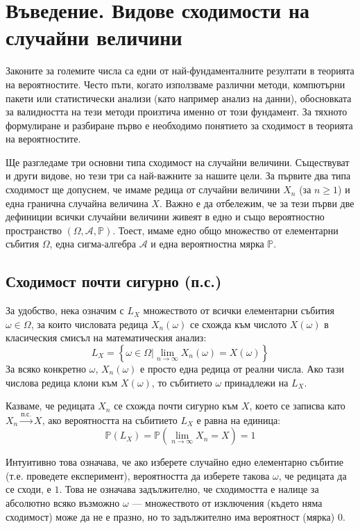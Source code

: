 \section{Въведение. Видове сходимости на случайни величини}

Законите за големите числа са едни от най-фундаменталните резултати в теорията на вероятностите. Често пъти, когато използваме различни методи, компютърни пакети или статистически анализи (като например анализ на данни), обосновката за валидността на тези методи произтича именно от този фундамент. За тяхното формулиране и разбиране първо е необходимо понятието за сходимост в теорията на вероятностите.

Ще разгледаме три основни типа сходимост на случайни величини. Съществуват и други видове, но тези три са най-важните за нашите цели. За първите два типа сходимост ще допуснем, че имаме редица от случайни величини $X_n$ (за $n \ge 1$) и една гранична случайна величина $X$. Важно е да отбележим, че за тези първи две дефиниции всички случайни величини живеят в едно и също вероятностно пространство $(\Omega, \mathcal{A}, \mathbb{P})$. Тоест, имаме едно общо множество от елементарни събития $\Omega$, една сигма-алгебра $\mathcal{A}$ и една вероятностна мярка $\mathbb{P}$.

\subsection{Сходимост почти сигурно (п.с.)}

За удобство, нека означим с $L_X$ множеството от всички елементарни събития $\omega \in \Omega$, за които числовата редица $X_n(\omega)$ се схожда към числото $X(\omega)$ в класическия смисъл на математическия анализ:
\[
L_X = \left\{ \omega \in \Omega \mathrel{\bigg|} \lim_{n \to \infty} X_n(\omega) = X(\omega) \right\}
\]
За всяко конкретно $\omega$, $X_n(\omega)$ е просто една редица от реални числа. Ако тази числова редица клони към $X(\omega)$, то събитието $\omega$ принадлежи на $L_X$.

\begin{defn}
Казваме, че редицата $X_n$ се схожда почти сигурно към $X$, което се записва като $X_n \xrightarrow{\text{п.с.}} X$, ако вероятността на събитието $L_X$ е равна на единица:
\[
\mathbb{P}(L_X) = \mathbb{P}\left( \lim_{n \to \infty} X_n = X \right) = 1
\]
\end{defn}

Интуитивно това означава, че ако изберете случайно едно елементарно събитие (т.е. проведете експеримент), вероятността да изберете такова $\omega$, че редицата да се сходи, е $1$. Това не означава задължително, че сходимостта е налице за абсолютно всяко възможно $\omega$ — множеството от изключения (където няма сходимост) може да не е празно, но то задължително има вероятност (мярка) 0.

